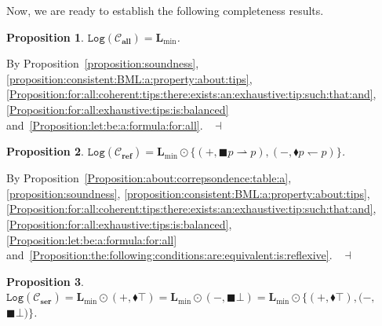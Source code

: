 \documentclass[draft]{article}
\newtheorem{proposition}{Proposition}
\newenvironment{proof}{{\bf Proof:}}{~$\dashv$\\}
\def\allfra{\mathbf{all}}
\def\reflexive{\mathbf{ref}}
\def\serial{\mathbf{ser}}
\def\Log{\mathtt{Log}}
\def\L{\mathbf{L}}
\begin{document}
%
%
%
%
%
%
%
%
%
%
%
%
%
%
Now, we are ready to establish the following completeness results.
%
%
\begin{proposition}\label{Proposition:let:be:a:class:of:frames:if:then:1}
%
%
$\Log({\mathcal C}_{\allfra}){=}\L_{\min}$.
%
%
\end{proposition}
%
%
\begin{proof}
%
%
By Proposition~\ref{proposition:soundness}, \ref{proposition:consistent:BML:a:property:about:tips}, \ref{Proposition:for:all:coherent:tips:there:exists:an:exhaustive:tip:such:that:and}, \ref{Proposition:for:all:exhaustive:tips:is:balanced} and~\ref{Proposition:let:be:a:formula:for:all}.
%
%
\medskip
%
%
\end{proof}
%
%
\begin{proposition}\label{Proposition:let:ba:a:class:of:frames:if:then:3}
%
%
$\Log({\mathcal C}_{\reflexive}){=}\L_{\min}{\odot}\{(+,{\blacksquare}p{\rightharpoonup}p),(-,{\blacklozenge}p{\leftharpoondown}p)\}$.
%
%
\end{proposition}
%
%
\begin{proof}
%
%
By Proposition~\ref{Proposition:about:correpsondence:table:a}, \ref{proposition:soundness}, \ref{proposition:consistent:BML:a:property:about:tips}, \ref{Proposition:for:all:coherent:tips:there:exists:an:exhaustive:tip:such:that:and}, \ref{Proposition:for:all:exhaustive:tips:is:balanced}, \ref{Proposition:let:be:a:formula:for:all} and~\ref{Proposition:the:following:conditions:are:equivalent:is:reflexive}.
%
%
\medskip
%
%
\end{proof}
%
%
\begin{proposition}\label{Proposition:let:ba:a:class:of:frames:if:then:2}
%
%
$\Log({\mathcal C}_{\serial}){=}\L_{\min}{\odot}(+,{\blacklozenge}{\top}){=}\L_{\min}{\odot}(-,{\blacksquare}{\bot}){=}\L_{\min}{\odot}\{(+,{\blacklozenge}{\top}),(-,
%
%
%
%
%
%
%
$\linebreak$
%
%
%
%
%
%
{\blacksquare}{\bot})\}$.
%
%
\end{proposition}
\end{document}
